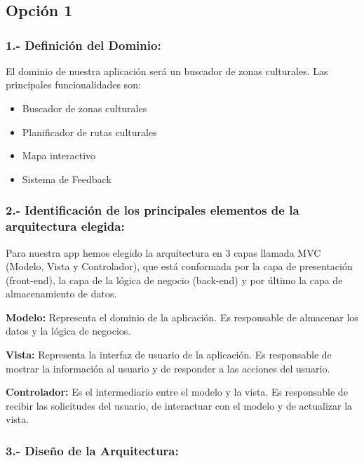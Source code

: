 \chapter{}

\section*{Opción 1}

\subsection*{1.- Definición del Dominio:}

El dominio de nuestra aplicación será un buscador de zonas culturales. Las principales funcionalidades son:
\begin{itemize}
	\item Buscador de zonas culturales
	\item Planificador de rutas culturales
	\item Mapa interactivo
	\item Sistema de Feedback
\end{itemize}

\subsection*{2.- Identificación de los principales elementos de la arquitectura elegida:}

Para nuestra app hemos elegido la arquitectura en 3 capas llamada MVC (Modelo, Vista y Controlador), que está conformada por la capa de presentación (front-end), la capa de la lógica de negocio (back-end) y por último la capa de almacenamiento de datos.

\textbf{Modelo:} Representa el dominio de la aplicación. Es responsable de almacenar los datos y la lógica de negocios.

\textbf{Vista:} Representa la interfaz de usuario de la aplicación. Es responsable de mostrar la información al usuario y de responder a las acciones del usuario.

\textbf{Controlador:} Es el intermediario entre el modelo y la vista. Es responsable de recibir las solicitudes del usuario, de interactuar con el modelo y de actualizar la vista.

\subsection*{3.- Diseño de la Arquitectura:}

